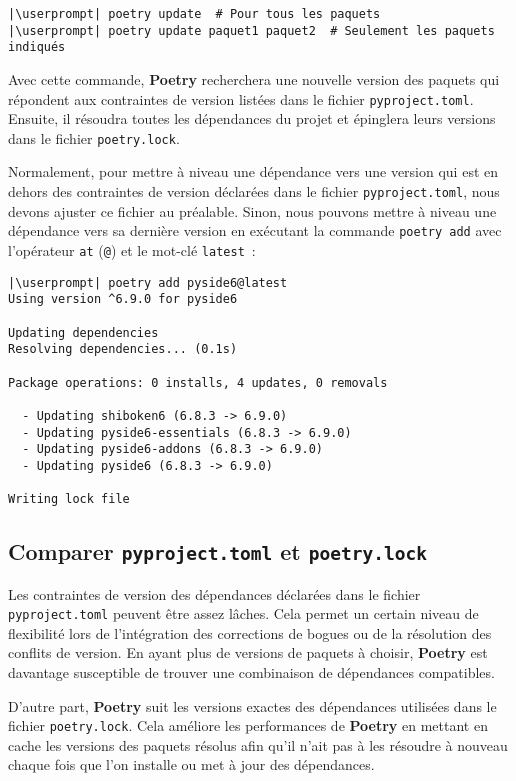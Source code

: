 \begin{lstlisting}[style=bash]
|\userprompt| poetry update  # Pour tous les paquets
|\userprompt| poetry update paquet1 paquet2  # Seulement les paquets indiqués
\end{lstlisting}

Avec cette commande, \textbf{Poetry} recherchera une nouvelle version des paquets qui répondent aux contraintes de version listées dans le fichier \texttt{pyproject.toml}. Ensuite, il résoudra toutes les dépendances du projet et épinglera leurs versions dans le fichier \texttt{poetry.lock}. 

Normalement, pour mettre à niveau une dépendance vers une version qui est en dehors des contraintes de version déclarées dans le fichier \texttt{pyproject.toml}, nous devons ajuster ce fichier au préalable. Sinon, nous pouvons mettre à niveau une dépendance vers sa dernière version en exécutant la commande \texttt{poetry add} avec l’opérateur \texttt{at} (\texttt{@}) et le mot-clé \texttt{latest} :
\begin{lstlisting}[style=bash]
|\userprompt| poetry add pyside6@latest
Using version ^6.9.0 for pyside6

Updating dependencies
Resolving dependencies... (0.1s)

Package operations: 0 installs, 4 updates, 0 removals

  - Updating shiboken6 (6.8.3 -> 6.9.0)
  - Updating pyside6-essentials (6.8.3 -> 6.9.0)
  - Updating pyside6-addons (6.8.3 -> 6.9.0)
  - Updating pyside6 (6.8.3 -> 6.9.0)

Writing lock file
\end{lstlisting}

\subsection*{Comparer \texttt{pyproject.toml} et \texttt{poetry.lock}}

Les contraintes de version des dépendances déclarées dans le fichier \texttt{pyproject.toml} peuvent être assez lâches. Cela permet un certain niveau de flexibilité lors de l’intégration des corrections de bogues ou de la résolution des conflits de version. En ayant plus de versions de paquets à choisir, \textbf{Poetry} est davantage susceptible de trouver une combinaison de dépendances compatibles.

D’autre part, \textbf{Poetry} suit les versions exactes des dépendances utilisées dans le fichier \texttt{poetry.lock}. Cela améliore les performances de \textbf{Poetry} en mettant en cache les versions des paquets résolus afin qu’il n’ait pas à les résoudre à nouveau chaque fois que l'on installe ou met à jour des dépendances.

